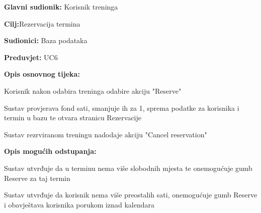 				
					\noindent {}		
						\begin{packed_item}
						
						\item \textbf{Glavni sudionik: }Korisnik treninga
						\item  \textbf{Cilj:}Rezervacija termina
						\item  \textbf{Sudionici:} Baza podataka
						\item  \textbf{Preduvjet:} UC6
						\item  \textbf{Opis osnovnog tijeka:}
						
						\item[] \begin{packed_enum}

							\item Korisnik nakon odabira treninga odabire akciju "Reserve" 
							\item Sustav provjerava fond sati, smanjuje ih za 1, sprema podatke za korisnika i termin u bazu te otvara stranicu Rezervacije
							\item Sustav rezrviranom treningu nadodaje akciju "Cancel reservation"

							
						\end{packed_enum}
						
						\item  \textbf{Opis mogućih odstupanja:}
						
						\begin{packed_enum}
							
							\item[1.a] Sustav utvrđuje da u terminu nema više slobodnih mjesta te onemogućuje gumb Reserve za taj termin
							\item[1.b] Sustav utvrđuje da korisnik nema više preostalih sati, onemogućuje gumb Reserve i obavještava korisnika porukom iznad kalendara
							
						\end{packed_enum}
						
					\end{packed_item}
				
